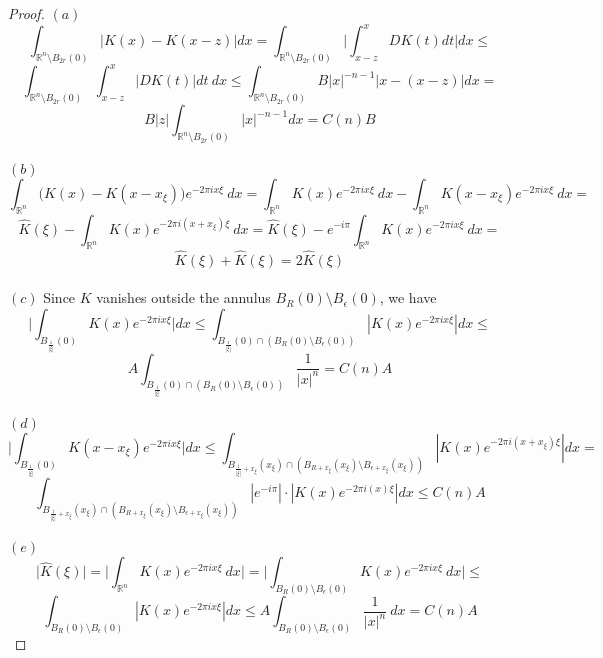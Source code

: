 \documentclass[12pt]{article}
\newenvironment{exercise}[2][Exercise]{\begin{trivlist}
\item[\hskip \labelsep {\bfseries #1}\hskip \labelsep {\bfseries #2.}]}{\end{trivlist}}
\begin{document}
\begin{proof}
  $(a)$
  $$\int_{\mathbb{R}^n \setminus B_{2r}(0)} |K(x) - K(x-z)| dx = \int_{\mathbb{R}^n \setminus B_{2r}(0)} \Big| \int_{x-z}^{x} DK(t) dt \Big| dx \le$$
  $$\int_{\mathbb{R}^n \setminus B_{2r}(0)} \int_{x-z}^{x} \Big|DK(t)\Big| dt\ dx \le \int_{\mathbb{R}^n \setminus B_{2r}(0)} B |x|^{-n-1} |x - (x-z)| dx =$$
  $$B |z| \int_{\mathbb{R}^n \setminus B_{2r}(0)} |x|^{-n-1}dx = C(n)B$$\\
  $(b)$
  $$\int_{\mathbb{R}^n} \Big( K(x) - K(x - x_{\xi}) \Big) e^{-2 \pi i x \xi}\ dx = \int_{\mathbb{R}^n} K(x) e^{-2 \pi i x \xi}\ dx - \int_{\mathbb{R}^n} K(x-x_\xi) e^{-2 \pi i x \xi}\ dx =$$
  $$\hat{K}(\xi) - \int_{\mathbb{R}^n} K(x) e^{-2 \pi i (x + x_\xi) \xi}\ dx = \hat{K}(\xi) - e^{-i \pi} \int_{\mathbb{R}^n} K(x) e^{-2 \pi i x \xi}\ dx =$$
  $$\hat{K}(\xi) + \hat{K}(\xi) = 2 \hat{K}(\xi)$$\\
  $(c)$ Since $K$ vanishes outside the annulus $B_R(0) \setminus B_\epsilon(0)$, we have
  $$\Big| \int_{B_\frac{1}{|\xi|}(0)} K(x)e^{-2 \pi i x \xi} \Big| dx \le \int_{B_\frac{1}{|\xi|}(0) \cap  (B_R(0) \setminus B_\epsilon(0))} |K(x)e^{-2 \pi i x \xi}| dx \le$$
  $$A \int_{B_\frac{1}{|\xi|}(0) \cap  (B_R(0) \setminus B_\epsilon(0))} \dfrac{1}{|x|^n} = C(n)A$$\\
  $(d)$
  $$\Big| \int_{B_\frac{1}{|\xi|}(0)} K(x-x_\xi)e^{-2 \pi i x \xi} \Big| dx \le \int_{B_{\frac{1}{|\xi|}+x_\xi}(x_\xi) \cap  (B_{R+x_\xi}(x_\xi) \setminus B_{\epsilon+x_\xi}(x_\xi))} |K(x)e^{-2 \pi i (x+x_\xi) \xi}| dx =$$ $$\int_{B_{\frac{1}{|\xi|}+x_\xi}(x_\xi) \cap (B_{R+x_\xi}(x_\xi) \setminus B_{\epsilon+x_\xi}(x_\xi))} |e^{-i \pi}| \cdot |K(x)e^{-2 \pi i (x) \xi}| dx \le C(n) A$$\\
  $(e)$
  $$\Big| \hat{K}(\xi) \Big| = \Big| \int_{\mathbb{R}^n} K(x) e^{-2 \pi i x \xi}\ dx \Big| = \Big| \int_{B_R(0) \setminus B_\epsilon(0)} K(x) e^{-2 \pi i x \xi}\ dx \Big| \le$$
  $$\int_{B_R(0) \setminus B_\epsilon(0)} |K(x) e^{-2 \pi i x \xi}| dx \le A \int_{B_R(0) \setminus B_\epsilon(0)} \frac{1}{|x|^n}\ dx = C(n) A$$
\end{proof}

\begin{exercise}{3}
\end{exercise}
\end{document}
